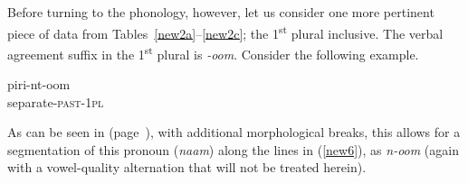 \documentclass[output=paper]{langscibook}
\begin{document}
Before turning to the phonology, however, let us consider one more pertinent piece of data from Tables~\ref{new2a}--\ref{new2c}; the 1\textsuperscript{st} plural inclusive. The verbal agreement suffix in the 1\textsuperscript{st} plural is \textit{-oom}. Consider the following example.

\begin{exe}
\ex \label{new7}
\gll piri-nt-oom \\
separate-\textsc{past-1pl}   \\
\end{exe}

As can be seen in  (page~\pageref{new2a}),
with additional morphological breaks, this allows for a segmentation of this pronoun (\textit{naam}) along the lines in (\ref{new6}), as \textit{n-oom} (again with a vowel-quality alternation that will not be treated herein).

\end{document}
